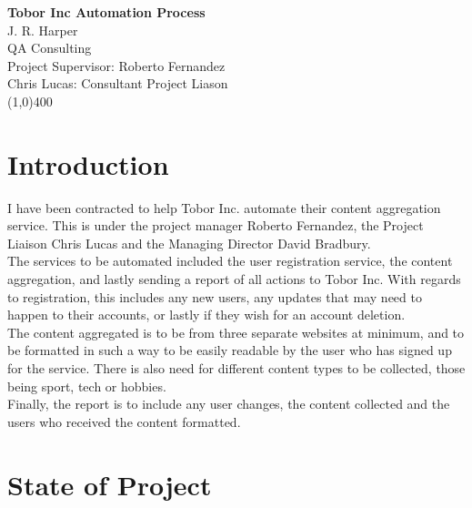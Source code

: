 \documentclass[12]{article}
\begin{document}
\begin{titlepage}
\begin{center}
	
	\LARGE{\bf{Tobor Inc Automation Process}}\\
	[1cm]
	\large{J. R. Harper \\ QA Consulting \\ Project Supervisor: Roberto Fernandez}\\
	\large{Chris Lucas: Consultant Project Liason } \\
	[0.2cm]
	\line(1,0){400} \\
	
\end{center}


\end{titlepage}

\cleardoublepage

\tableofcontents

\thispagestyle{empty}

\cleardoublepage


\section{Introduction}\label{sec:intro}

I have been contracted to help Tobor Inc. automate their content aggregation service. This is under the project manager Roberto Fernandez, the Project Liaison Chris Lucas and the Managing Director David Bradbury. 
\\
The services to be automated included the user registration service, the content aggregation, and lastly sending a report of all actions to Tobor Inc. With regards to registration, this includes any new users, any updates that may need to happen to their accounts, or lastly if they wish for an account deletion.
\\
The content aggregated is to be from three separate websites at minimum, and to be formatted in such a way to be easily readable by the user who has signed up for the service. There is also need for different content types to be collected, those being sport, tech or hobbies. 
\\
Finally, the report is to include any user changes, the content collected and the users who received the content formatted.

\setcounter{page}{1}

\section{State of Project}
\end{document}
